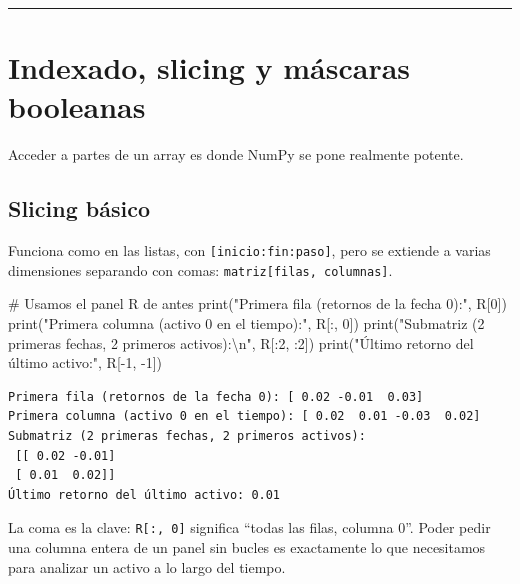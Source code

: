 \documentclass[
  spanish,
  letterpaper,
  DIV=11,
  numbers=noendperiod]{scrreprt}
\newenvironment{Shaded}{\begin{snugshade}}{\end{snugshade}}
\newcommand{\BuiltInTok}[1]{\textcolor[rgb]{0.00,0.23,0.31}{#1}}
\newcommand{\CharTok}[1]{\textcolor[rgb]{0.13,0.47,0.30}{#1}}
\newcommand{\CommentTok}[1]{\textcolor[rgb]{0.37,0.37,0.37}{#1}}
\newcommand{\DecValTok}[1]{\textcolor[rgb]{0.68,0.00,0.00}{#1}}
\newcommand{\NormalTok}[1]{\textcolor[rgb]{0.00,0.23,0.31}{#1}}
\newcommand{\OperatorTok}[1]{\textcolor[rgb]{0.37,0.37,0.37}{#1}}
\newcommand{\StringTok}[1]{\textcolor[rgb]{0.13,0.47,0.30}{#1}}
\begin{document}
\begin{center}\rule{0.5\linewidth}{0.5pt}\end{center}

\section{Indexado, slicing y máscaras
booleanas}\label{indexado-slicing-y-muxe1scaras-booleanas}

Acceder a partes de un array es donde NumPy se pone realmente potente.

\subsection{Slicing básico}\label{slicing-buxe1sico}

Funciona como en las listas, con \texttt{{[}inicio:fin:paso{]}}, pero se
extiende a varias dimensiones separando con comas:
\texttt{matriz{[}filas,\ columnas{]}}.

\label{slicing}
\begin{Shaded}
\begin{Highlighting}[]
\CommentTok{\# Usamos el panel R de antes}
\BuiltInTok{print}\NormalTok{(}\StringTok{"Primera fila (retornos de la fecha 0):"}\NormalTok{, R[}\DecValTok{0}\NormalTok{])}
\BuiltInTok{print}\NormalTok{(}\StringTok{"Primera columna (activo 0 en el tiempo):"}\NormalTok{, R[:, }\DecValTok{0}\NormalTok{])}
\BuiltInTok{print}\NormalTok{(}\StringTok{"Submatriz (2 primeras fechas, 2 primeros activos):}\CharTok{\textbackslash{}n}\StringTok{"}\NormalTok{, R[:}\DecValTok{2}\NormalTok{, :}\DecValTok{2}\NormalTok{])}
\BuiltInTok{print}\NormalTok{(}\StringTok{"Último retorno del último activo:"}\NormalTok{, R[}\OperatorTok{{-}}\DecValTok{1}\NormalTok{, }\OperatorTok{{-}}\DecValTok{1}\NormalTok{])}
\end{Highlighting}
\end{Shaded}

\begin{verbatim}
Primera fila (retornos de la fecha 0): [ 0.02 -0.01  0.03]
Primera columna (activo 0 en el tiempo): [ 0.02  0.01 -0.03  0.02]
Submatriz (2 primeras fechas, 2 primeros activos):
 [[ 0.02 -0.01]
 [ 0.01  0.02]]
Último retorno del último activo: 0.01
\end{verbatim}

La coma es la clave: \texttt{R{[}:,\ 0{]}} significa ``todas las filas,
columna 0''. Poder pedir una columna entera de un panel sin bucles es
exactamente lo que necesitamos para analizar un activo a lo largo del
tiempo.
\end{document}

